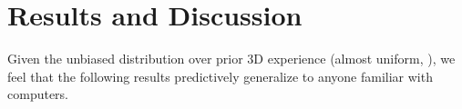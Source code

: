 \section{Results and Discussion}\label{sec:results}

Given the unbiased distribution over prior 3D experience (almost uniform,
), we feel that the following results predictively
generalize to anyone familiar with computers.





